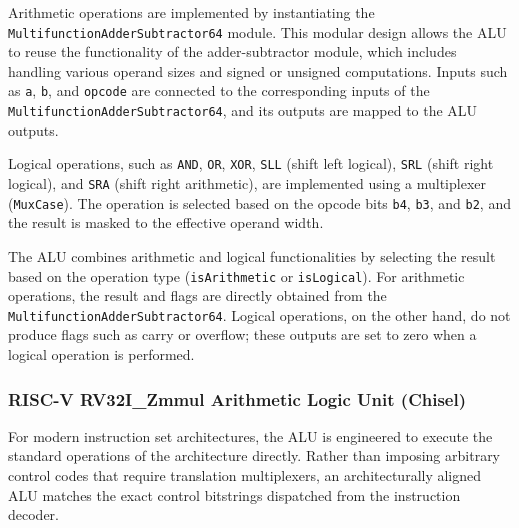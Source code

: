 {Arithmetic operations are implemented by instantiating the \texttt{MultifunctionAdderSubtractor64} module. This modular design allows the ALU to reuse the functionality of the adder-subtractor module, which includes handling various operand sizes and signed or unsigned computations. Inputs such as \texttt{a}, \texttt{b}, and \texttt{opcode} are connected to the corresponding inputs of the \texttt{MultifunctionAdderSubtractor64}, and its outputs are mapped to the ALU outputs.


Logical operations, such as \texttt{AND}, \texttt{OR}, \texttt{XOR}, \texttt{SLL} (shift left logical), \texttt{SRL} (shift right logical), and \texttt{SRA} (shift right arithmetic), are implemented using a multiplexer (\texttt{MuxCase}). The operation is selected based on the opcode bits \texttt{b4}, \texttt{b3}, and \texttt{b2}, and the result is masked to the effective operand width.

The ALU combines arithmetic and logical functionalities by selecting the result based on the operation type (\texttt{isArithmetic} or \texttt{isLogical}). For arithmetic operations, the result and flags are directly obtained from the \texttt{MultifunctionAdderSubtractor64}. Logical operations, on the other hand, do not produce flags such as carry or overflow; these outputs are set to zero when a logical operation is performed.


\subsubsection{RISC-V RV32I\_Zmmul Arithmetic Logic Unit (Chisel)}
For modern instruction set architectures, the ALU is engineered to execute the standard operations of the architecture directly. Rather than imposing arbitrary control codes that require translation multiplexers, an architecturally aligned ALU matches the exact control bitstrings dispatched from the instruction decoder.

}
